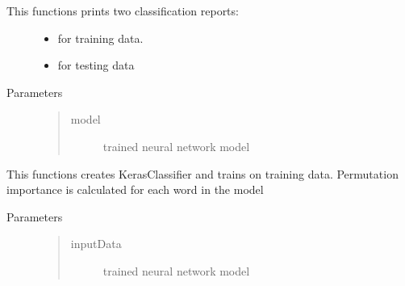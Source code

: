 \documentclass[letterpaper,10pt,english]{sphinxmanual}
\begin{document}
\begin{fulllineitems}
\label{\detokenize{ff:ff.keras_classify}}
\pysigstartsignatures
{}
\pysigstopsignatures\begin{description}
\item[{This functions prints two classification reports:}] \leavevmode\begin{itemize}
\item {} 
\sphinxAtStartPar
for training data.

\item {} 
\sphinxAtStartPar
for testing data

\end{itemize}

\item[{Parameters}] \leavevmode\begin{quote}\begin{description}
\item[{model}] \leavevmode
\sphinxAtStartPar
trained neural network model

\end{description}\end{quote}

\end{description}

\end{fulllineitems}


\begin{fulllineitems}
\label{\detokenize{ff:ff.keras_permutations}}
\pysigstartsignatures
{}
\pysigstopsignatures
\sphinxAtStartPar
This functions creates KerasClassifier and trains on training data.
Permutation importance is calculated for each word in the model
\begin{description}
\item[{Parameters}] \leavevmode\begin{quote}\begin{description}
\item[{inputData}] \leavevmode
\sphinxAtStartPar
trained neural network model

\end{description}\end{quote}

\end{description}

\end{fulllineitems}
\end{document}
